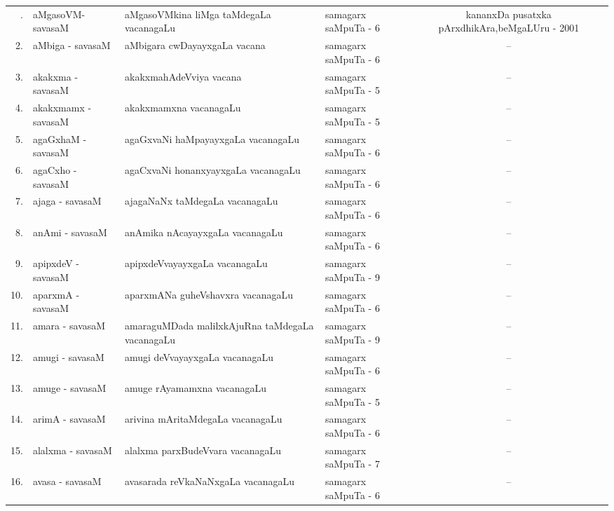 {\renewcommand{\arraystretch}{1.35}
\begin{longtable}{rl>{\raggedright}p{5.5cm}lc}
\hline
\endfirsthead
\hline
\endhead
\hline
\endfoot
\endlastfoot
1. & aMgasoVM-savasaM & aMgasoVMkina liMga taMdegaLa vacanagaLu & samagarx saMpuTa - 6 & \multicolumn{1}{p{3.5cm}}{kananxDa pusatxka pArxdhikAra,\newline beMgaLUru - 2001}\\
2. & aMbiga - savasaM & aMbigara cwDayayxgaLa vacana & samagarx saMpuTa - 6 & --\\
3. & akakxma - savasaM & akakxmahAdeVviya vacana & samagarx saMpuTa - 5 & --\\
4. & akakxmamx - savasaM & akakxmamxna vacanagaLu & samagarx saMpuTa - 5 & --\\
5. & agaGxhaM - savasaM & agaGxvaNi haMpayayxgaLa vacanagaLu & samagarx saMpuTa - 6 & --\\
6. & agaCxho - savasaM & agaCxvaNi honanxyayxgaLa vacanagaLu & samagarx saMpuTa - 6 & --\\
7. & ajaga - savasaM & ajagaNaNx taMdegaLa vacanagaLu & samagarx saMpuTa - 6 & --\\
8. & anAmi - savasaM & anAmika nAcayayxgaLa vacanagaLu & samagarx saMpuTa - 6 & --\\
9. & apipxdeV - savasaM & apipxdeVvayayxgaLa vacanagaLu & samagarx saMpuTa - 9 & --\\
10. & aparxmA - savasaM & aparxmANa guheVshavxra vacanagaLu & samagarx saMpuTa - 6 & --\\
11. & amara - savasaM & amaraguMDada malilxkAjuRna taMdegaLa vacanagaLu & samagarx saMpuTa - 9 & --\\
12. & amugi - savasaM & amugi deVvayayxgaLa vacanagaLu & samagarx saMpuTa - 6 & --\\
13. & amuge - savasaM & amuge rAyamamxna vacanagaLu & samagarx saMpuTa - 5 & --\\
14. & arimA - savasaM & arivina mAritaMdegaLa vacanagaLu & samagarx saMpuTa - 6 & --\\
15. & alalxma - savasaM & alalxma parxBudeVvara vacanagaLu & samagarx saMpuTa - 7 & --\\
16. & avasa - savasaM &  avasarada reVkaNaNxgaLa vacanagaLu & samagarx saMpuTa - 6 & --\\
\hline
\end{longtable}}


